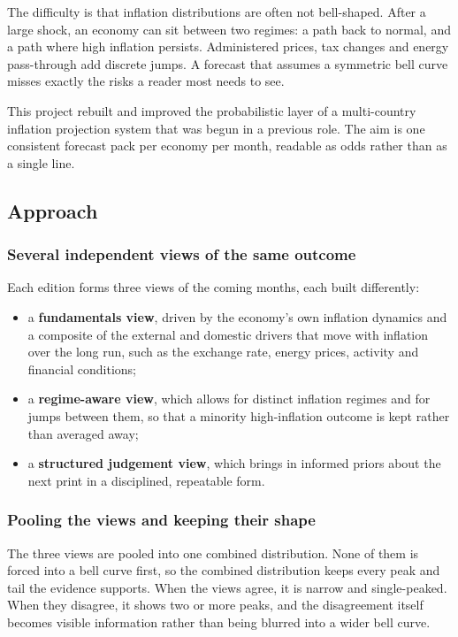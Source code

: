 \documentclass[
  british,
  a4paper,
]{article}
\providecommand{\tightlist}{%
  \setlength{\itemsep}{0pt}\setlength{\parskip}{0pt}}
\begin{document}
The difficulty is that inflation distributions are often not
bell-shaped. After a large shock, an economy can sit between two
regimes: a path back to normal, and a path where high inflation
persists. Administered prices, tax changes and energy pass-through add
discrete jumps. A forecast that assumes a symmetric bell curve misses
exactly the risks a reader most needs to see.

This project rebuilt and improved the probabilistic layer of a
multi-country inflation projection system that was begun in a previous
role. The aim is one consistent forecast pack per economy per month,
readable as odds rather than as a single line.

\subsection{Approach}\label{approach}

\subsubsection{Several independent views of the same
outcome}\label{several-independent-views-of-the-same-outcome}

Each edition forms three views of the coming months, each built
differently:

\begin{itemize}
\tightlist
\item
  a \textbf{fundamentals view}, driven by the economy's own inflation
  dynamics and a composite of the external and domestic drivers that
  move with inflation over the long run, such as the exchange rate,
  energy prices, activity and financial conditions;
\item
  a \textbf{regime-aware view}, which allows for distinct inflation
  regimes and for jumps between them, so that a minority high-inflation
  outcome is kept rather than averaged away;
\item
  a \textbf{structured judgement view}, which brings in informed priors
  about the next print in a disciplined, repeatable form.
\end{itemize}

\subsubsection{Pooling the views and keeping their
shape}\label{pooling-the-views-and-keeping-their-shape}

The three views are pooled into one combined distribution. None of them
is forced into a bell curve first, so the combined distribution keeps
every peak and tail the evidence supports. When the views agree, it is
narrow and single-peaked. When they disagree, it shows two or more
peaks, and the disagreement itself becomes visible information rather
than being blurred into a wider bell curve.
\end{document}
